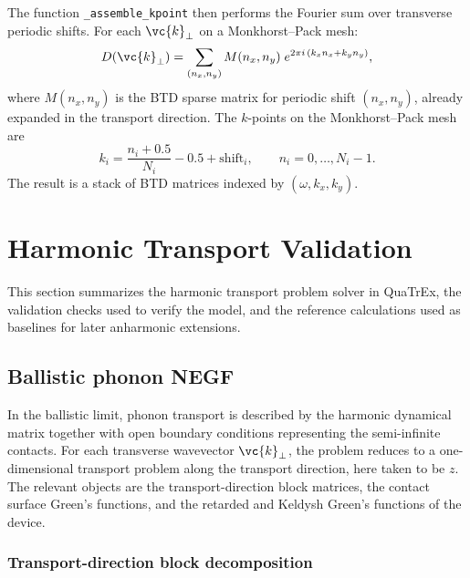 The function \texttt{\_assemble\_kpoint} then performs the Fourier sum
over transverse periodic shifts.  For each $\vc{k}_\perp$ on a
Monkhorst--Pack mesh:
\begin{equation}\label{eq:assemble}
  D(\vc{k}_\perp)
  = \sum_{(n_x,n_y)} M(n_x,n_y)\;
    e^{2\pi i\,(k_x n_x + k_y n_y)},
\end{equation}
where $M(n_x,n_y)$ is the BTD sparse matrix for periodic shift
$(n_x,n_y)$, already expanded in the transport direction.  The
$k$-points on the Monkhorst--Pack mesh are
\begin{equation}
  k_i = \frac{n_i + 0.5}{N_i} - 0.5 + \text{shift}_i,
  \qquad n_i = 0,\ldots,N_i-1.
\end{equation}
The result is a stack of BTD matrices indexed by
$(\omega,k_x,k_y)$.

\section{Harmonic Transport Validation}
\label{sec:harmonic_validation}

This section summarizes the harmonic transport problem solver in
QuaTrEx, the validation checks used to verify the model, and the
reference calculations used as baselines for later
anharmonic extensions.

\subsection{Ballistic phonon NEGF}
\label{sec:negf}

In the ballistic limit, phonon transport is described by the harmonic
dynamical matrix together with open boundary conditions representing the
semi-infinite contacts.  For each transverse wavevector
$\vc{k}_\perp$, the problem reduces to a one-dimensional transport
problem along the transport direction, here taken to be $z$.  The
relevant objects are the transport-direction block matrices, the contact
surface Green's functions, and the retarded and Keldysh Green's
functions of the device.

\subsubsection{Transport-direction block decomposition}


